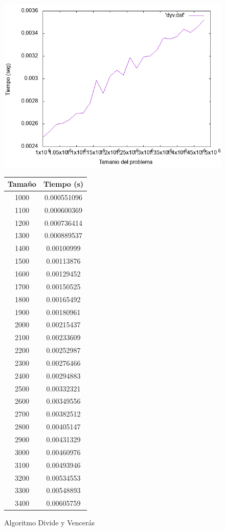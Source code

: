 \documentclass[12pt,spanish]{article}
\begin{document}
\begin{figure}[H]
\centering

\includegraphics[scale=0.75]{dyv.png}

\vskip 0.5cm

\begin{tabular}{|c|c|}
\hline
\textbf{Tamaño} & \textbf{Tiempo (s)} \\
\hline
1000 & 0.000551096 \\
\hline
1100 & 0.000600369 \\
\hline
1200 & 0.000736414 \\
\hline
1300 & 0.000889537 \\
\hline
1400 & 0.00100999 \\
\hline
1500 & 0.00113876 \\
\hline
1600 & 0.00129452 \\
\hline
1700 & 0.00150525 \\
\hline
1800 & 0.00165492 \\
\hline
1900 & 0.00180961 \\
\hline
2000 & 0.00215437 \\
\hline
2100 & 0.00233609 \\
\hline
2200 & 0.00252987 \\
\hline
2300 & 0.00276466 \\
\hline
2400 & 0.00294883 \\
\hline
2500 & 0.00332321 \\
\hline
2600 & 0.00349556 \\
\hline
2700 & 0.00382512 \\
\hline
2800 & 0.00405147 \\
\hline
2900 & 0.00431329 \\
\hline
3000 & 0.00460976 \\
\hline
3100 & 0.00493946 \\
\hline
3200 & 0.00534553 \\
\hline
3300 & 0.00548893 \\
\hline
3400 & 0.00605759 \\

\hline
\end{tabular}


\caption{Algoritmo Divide y Vencerás}
\end{figure}
\end{document}
